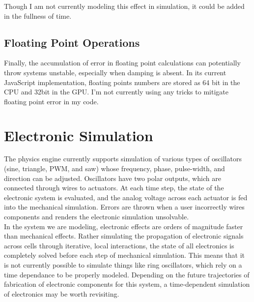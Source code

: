 {Though I am not currently modeling this effect in simulation, it could be added in the fullness of time.

%

\subsection{Floating Point Operations}

Finally, the accumulation of error in floating point calculations can potentially throw systems unstable, especially when damping is absent.  In its current JavaScript implementation, floating points numbers are stored as 64 bit in the CPU and 32bit in the GPU.  I'm not currently using any tricks to mitigate floating point error in my code.

\section{Electronic Simulation}\label{sec:electronicSim}

The physics engine currently supports simulation of various types of oscillators (sine, triangle, PWM, and saw) whose frequency, phase, pulse-width, and direction can be adjusted.  Oscillators have two polar outputs, which are connected through wires to actuators.  At each time step, the state of the electronic system is evaluated, and the analog voltage across each actuator is fed into the mechanical simulation.  Errors are thrown when a user incorrectly wires components and renders the electronic simulation unsolvable.\\

In the system we are modeling, electronic effects are orders of magnitude faster than mechanical effects.  Rather simulating the propagation of electronic signals across cells through iterative, local interactions, the state of all electronics is completely solved before each step of mechanical simulation.  This means that it is not currently possible to simulate things like ring oscillators, which rely on a time dependance to be properly modeled.  Depending on the future trajectories of fabrication of electronic components for this system, a time-dependent simulation of electronics may be worth revisiting.

}
